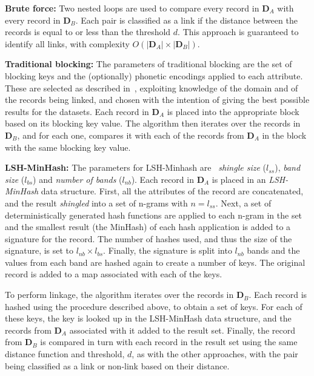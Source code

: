 \documentclass{llncs}
\begin{document}
\smallskip
\textbf{Brute force:}
Two nested loops are used to compare every record in
$\mathbf{D}_A$ with every record in $\mathbf{D}_B$. Each pair is
classified as a link if the distance between the records is equal to
or less than the threshold $d$. This approach is guaranteed to identify
all links, with complexity $ O(|\mathbf{D}_A| \times |\mathbf{D}_B|)$.

\smallskip
\textbf{Traditional blocking:}
The parameters of traditional blocking are the set of blocking keys
and the (optionally) phonetic
encodings applied to each attribute. These are selected as described
in~\cite{Chr12b}, exploiting knowledge of the domain and of the
records being linked, and chosen with the intention of giving the
best possible results for the datasets. Each record in $\mathbf{D}_A$
is placed into the appropriate block based on its blocking key value.
The algorithm then iterates over the records in $\mathbf{D}_B$, and
for each one, compares it with each of the records from $\mathbf{D}_A$
in the block with the same blocking key value.

\smallskip
\textbf{LSH-MinHash:}
The parameters for LSH-Minhash are~\cite{Broder1997} \emph{shingle
size} ($l_{ss}$), \emph{band size} ($l_{bs}$) and \emph{number of
bands} ($l_{nb}$). Each record in $\mathbf{D}_A$ is placed in an
\emph{LSH-MinHash} data structure. First, all the attributes of the
record are concatenated, and the result \emph{shingled} into a set of
n-grams with $n = l_{ss}$. Next, a set of deterministically generated
hash functions are applied to each n-gram in the set and the smallest
result (the MinHash) of each hash application is added to a signature
for the record. The number of hashes used, and thus the size of the
signature, is set to $l_{nb} \times l_{bs}$. Finally, the signature is
split into $l_{nb}$ bands and the values from each band are hashed
again to create a number of keys. The original record is added to a
map associated with each of the keys. 

To perform linkage, the algorithm iterates over the records in
$\mathbf{D}_B$. Each record is hashed using the procedure described
above, to obtain a set of keys. For each of these keys, the key is
looked up in the LSH-MinHash data structure, and the records from
$\mathbf{D}_A$ associated with it added to the result set. Finally,
the record from $\mathbf{D}_B$ is compared in turn with each record
in the result set using the same distance function and threshold, $d$,
as with the other approaches, with the pair being classified as a link
or non-link based on their distance.
\end{document}
